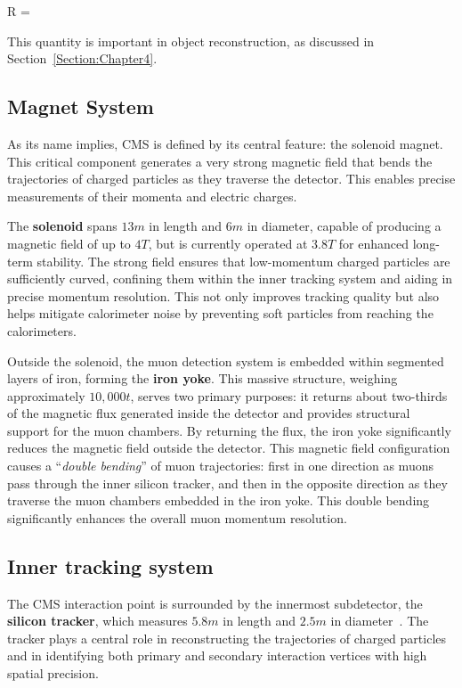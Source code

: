 \begin{equation_pad}
    \Delta R = 
\end{equation_pad}

This quantity is important in object reconstruction, as discussed in Section~\ref{Section:Chapter4}.%

\subsection{Magnet System}

As its name implies, CMS is defined by its central feature: the solenoid magnet. This critical component generates a very strong magnetic field that bends the trajectories of charged particles as they traverse the detector. This enables precise measurements of their momenta and electric charges. 

The \textbf{solenoid} spans $13\unit{m}$ in length and $6\unit{m}$ in diameter, capable of producing a magnetic field of up to $4\unit{T}$, but is currently operated at $3.8\unit{T}$ for enhanced long-term stability. The strong field ensures that low-momentum charged particles are sufficiently curved, confining them within the inner tracking system and aiding in precise momentum resolution. This not only improves tracking quality but also helps mitigate calorimeter noise by preventing soft particles from reaching the calorimeters.

Outside the solenoid, the muon detection system is embedded within segmented layers of iron, forming the \textbf{iron yoke}. This massive structure, weighing approximately $10,000\unit{t}$, serves two primary purposes: it returns about two-thirds of the magnetic flux generated inside the detector and provides structural support for the muon chambers. By returning the flux, the iron yoke significantly reduces the magnetic field outside the detector. This magnetic field configuration causes a ``\textit{double bending}'' of muon trajectories: first in one direction as muons pass through the inner silicon tracker, and then in the opposite direction as they traverse the muon chambers embedded in the iron yoke. This double bending significantly enhances the overall muon momentum resolution.

\subsection{Inner tracking system}
The CMS interaction point is surrounded by the innermost subdetector, the \textbf{silicon tracker}, which measures $5.8\unit{m}$ in length and $2.5\unit{m}$ in diameter~\cite{LHC_CMS,CMS_Detector_Run3}. The tracker plays a central role in reconstructing the trajectories of charged particles and in identifying both primary and secondary interaction vertices with high spatial precision.

